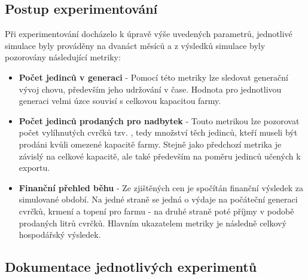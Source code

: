 \documentclass[11pt, a4paper, titlepage]{article}
\begin{document}
    \subsection{Postup experimentování}

    Při experimentování docházelo k úpravě výše uvedených parametrů, jednotlivé simulace byly prováděny na dvanáct měsíců
    a z výsledků simulace byly pozorovány následující metriky:

    \begin{itemize}
        \item \textbf{Počet jedinců v generaci} - Pomocí této metriky lze sledovat generační vývoj chovu, především
        jeho udržování v čase. Hodnota pro jednotlivou generaci velmi úzce souvisí s celkovou kapacitou farmy.
        \item \textbf{Počet jedinců prodaných pro nadbytek} - Touto metrikou lze pozorovat počet vylíhnutých cvrčků tzv. ,
        tedy množství těch jedinců, kteří museli být prodáni kvůli omezené kapacitě farmy. Stejně jako předchozí metrika
        je závislý na celkové kapacitě, ale také především na poměru jedinců učených k exportu.
        \item \textbf{Finanční přehled běhu} - Ze zjištěných cen je spočítán finanční výsledek za simulované období.
        Na jedné straně se jedná o výdaje na počáteční generaci cvrčků, krmení a topení pro farmu - na druhé straně poté
        příjmy v podobě prodaných litrů cvrčků. Hlavním ukazatelem metriky je následně celkový hospodářský výsledek.
    \end{itemize}

    \subsection{Dokumentace jednotlivých experimentů}
\end{document}
